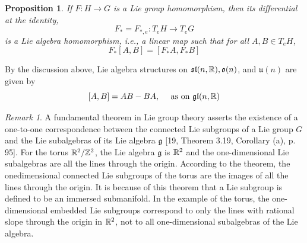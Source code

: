 \documentclass{amsart}
\let\originalmathbb\mathbb
\renewcommand{\mathbb}[1]{%
    \ifstrequal{#1}{1}{\mathbbm{#1}}{\originalmathbb{#1}}%
}
\theoremstyle{plain}
\newtheorem{proposition}[theorem]{Proposition}
\theoremstyle{definition}
\theoremstyle{remark}
\newtheorem{remark}[theorem]{Remark}
\begin{document}
\begin{proposition}
If $F: H \rightarrow G$ is a Lie group homomorphism, then its differential at the identity,
\[
F_*=F_{*, e}: T_e H \rightarrow T_e G
\]is a Lie algebra homomorphism, i.e., a linear map such that for all $A, B \in T_e H$,
\[
F_*[A, B]=\left[F_* A, F_* B\right]
\]
\end{proposition}
By the discussion above, Lie algebra structures on $\mathfrak{s l}(n, \mathbb{R}), \mathfrak{o}(n)$, and $\mathfrak{u}(n)$ are given by
\[
[A, B]=A B-B A, \quad \text { as on } \mathfrak{g} \mathfrak{l}(n, \mathbb{R})
\]
\begin{remark}
A fundamental theorem in Lie group theory asserts the existence of a one-to-one correspondence between the connected Lie subgroups of a Lie group $G$ and the Lie subalgebras of its Lie algebra $\mathfrak{g}$ [19, Theorem 3.19, Corollary (a), p. 95]. For the torus $\mathbb{R}^2 / \mathbb{Z}^2$, the Lie algebra $\mathfrak{g}$ is $\mathbb{R}^2$ and the one-dimensional Lie subalgebras are all the lines through the origin. According to the theorem, the onedimensional connected Lie subgroups of the torus are the images of all the lines through the origin. It is because of this theorem that a Lie subgroup is defined to be an immersed submanifold. In the example of the torus, the one-dimensional embedded Lie subgroups correspond to only the lines with rational slope through the origin in $\mathbb{R}^2$, not to all one-dimensional subalgebras of the Lie algebra.
\end{remark}
\end{document}

